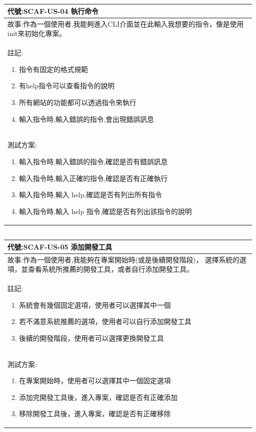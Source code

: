 \documentclass{report}
\begin{document}
\subsection*{}
\fontsize{12}{20}\selectfont
\begin{tabularx}{\textwidth}{|X|}
  \hline
  代號:SCAF-US-04 執行命令 \\
  \hline
  故事:作為一個使用者,我能夠進入CLI介面並在此輸入我想要的指令，像是使用init來初始化專案。 \\
  \hline
  註記:
  \begin{enumerate}
    \item 指令有固定的格式規範
    \item 有help指令可以查看指令的說明
    \item 所有網站的功能都可以透過指令來執行
    \item 輸入指令時,輸入錯誤的指令,會出現錯誤訊息
  \end{enumerate} \\
  \hline
  測試方案:
  \begin{enumerate}
    \item 輸入指令時,輸入錯誤的指令,確認是否有錯誤訊息
    \item 輸入指令時,輸入正確的指令,確認是否有正確執行
    \item 輸入指令時,輸入 help,確認是否有列出所有指令
    \item 輸入指令時,輸入 help 指令,確認是否有列出該指令的說明
  \end{enumerate} \\
  \hline
\end{tabularx}

\subsection*{}
\fontsize{12}{20}\selectfont
\begin{tabularx}{\textwidth}{|X|}
  \hline
  代號:SCAF-US-05 添加開發工具 \\
  \hline
  故事:作為一個使用者,我能夠在專案開始時(或是後續開發階段)， 選擇系統的選項，並查看系統所推薦的開發工具，或者自行添加開發工具。 \\
  \hline
  註記:
  \begin{enumerate}
    \item 系統會有幾個固定選項，使用者可以選擇其中一個
    \item 若不滿意系統推薦的選項，使用者可以自行添加開發工具
    \item 後續的開發階段，使用者可以選擇更換開發工具
  \end{enumerate} \\
  \hline
  測試方案:
  \begin{enumerate}
    \item 在專案開始時，使用者可以選擇其中一個固定選項
    \item 添加完開發工具後，進入專案，確認是否有正確添加
    \item 移除開發工具後，進入專案，確認是否有正確移除
  \end{enumerate} \\
  \hline
\end{tabularx}
\end{document}
